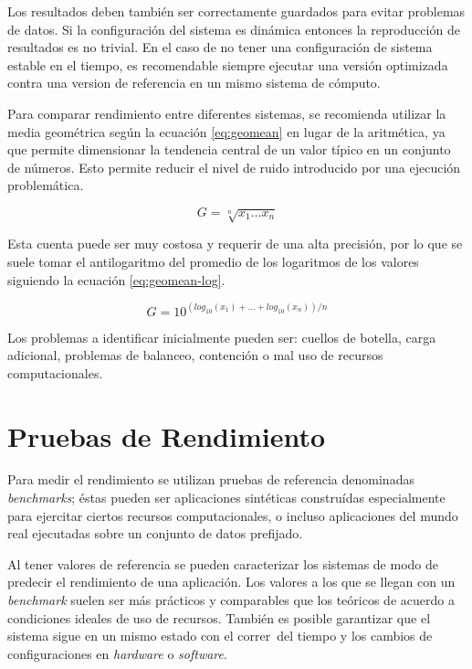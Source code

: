 \documentclass[a4paper]{report}
\begin{document}
Los resultados deben tambi\'en ser correctamente guardados para evitar
problemas de datos. Si la configuraci\'on del sistema es din\'amica entonces la
reproducci\'on de resultados es no trivial. En el caso de no tener una
configuraci\'on de sistema estable en el tiempo, es recomendable siempre
ejecutar una versi\'on optimizada contra una version de referencia en un mismo
sistema de c\'omputo.

\bigskip

Para comparar rendimiento entre diferentes sistemas, se recomienda utilizar
la media geom\'etrica seg\'un la ecuaci\'on \ref{eq:geomean} en lugar de la aritm\'etica,
ya que permite dimensionar la tendencia central de un valor t\'ipico en un conjunto
de n\'umeros. Esto permite reducir el nivel de ruido introducido por una ejecuci\'on
problem\'atica.

\begin{equation}
\label{eq:geomean}
G = \sqrt[n]{x_{1} \ldots x_{n}}
\end{equation}

Esta cuenta puede ser muy costosa y requerir de una alta precisi\'on, por lo que se
suele tomar el antilogaritmo del promedio de los logaritmos de los valores siguiendo
la ecuaci\'on \ref{eq:geomean-log}.

\begin{equation}
\label{eq:geomean-log}
G = 10 ^{( log _{10} (x_{1}) + \ldots + log _{10} (x_{n}) ) / n}
\end{equation}

\bigskip

Los problemas a identificar inicialmente pueden ser: cuellos de botella,
carga adicional, problemas de balanceo, contenci\'on o mal uso de recursos
computacionales.

\section{Pruebas de Rendimiento}

Para medir el rendimiento se utilizan pruebas de referencia denominadas
{\em benchmarks}; \'estas pueden ser aplicaciones sint\'eticas constru\'idas
especialmente para ejercitar ciertos recursos computacionales, o incluso
aplicaciones del mundo real ejecutadas sobre un conjunto de datos prefijado.

\bigskip

Al tener valores de referencia se pueden caracterizar los sistemas de modo de predecir el rendimiento de una aplicaci\'on.
Los valores a los que se llegan con un {\it benchmark} suelen ser m\'as pr\'acticos y
comparables que los te\'oricos de acuerdo a condiciones ideales de uso de recursos.
Tambi\'en es posible garantizar que el sistema sigue en un mismo estado con el correr\
del tiempo y los cambios de configuraciones en {\it hardware} o {\it software}.
\end{document}
